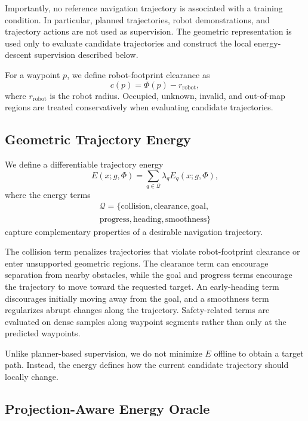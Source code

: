 \documentclass[letterpaper, 10 pt, conference]{ieeeconf}  %
\begin{document}
Importantly, no reference navigation trajectory is associated with a training
condition. In particular, planned trajectories, robot demonstrations, and
trajectory actions are not used as supervision. The geometric representation
is used only to evaluate candidate trajectories and construct the local
energy-descent supervision described below.

For a waypoint $p$, we define robot-footprint clearance as
\[
    c(p) = \Phi(p) - r_{\mathrm{robot}},
\]
where $r_{\mathrm{robot}}$ is the robot radius. Occupied, unknown, invalid,
and out-of-map regions are treated conservatively when evaluating candidate
trajectories.

\subsection{Geometric Trajectory Energy}
\label{sec:energy}

We define a differentiable trajectory energy
\[
    E(x;g,\Phi)
    =
    \sum_{q\in\mathcal{Q}} \lambda_q E_q(x;g,\Phi),
\]
where the energy terms
\[
    \begin{gathered}
    \mathcal{Q}
    =
    \{
    \mathrm{collision},
    \mathrm{clearance},
    \mathrm{goal},\\
    \mathrm{progress},
    \mathrm{heading},
    \mathrm{smoothness}
    \}
    \end{gathered}
\]
capture complementary properties of a desirable navigation trajectory.

The collision term penalizes trajectories that violate robot-footprint
clearance or enter unsupported geometric regions. The clearance term can
encourage separation from nearby obstacles, while the goal and progress terms
encourage the trajectory to move toward the requested target. An early-heading
term discourages initially moving away from the goal, and a smoothness term
regularizes abrupt changes along the trajectory. Safety-related terms are
evaluated on dense samples along waypoint segments rather than only at the
predicted waypoints.

Unlike planner-based supervision, we do not minimize $E$ offline to obtain a
target path. Instead, the energy defines how the current candidate trajectory
should locally change.

\subsection{Projection-Aware Energy Oracle}
\label{sec:oracle}
\end{document}
